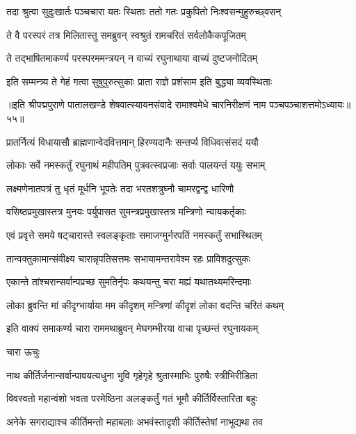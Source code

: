 \twolineshloka
{तदा श्रुत्वा सुदुःखार्तः पञ्चचारा यतः स्थिताः}
{ततो गतः प्रकुपितो निःश्वसन्मुहुरुच्छ्वसन्}%

\twolineshloka
{ते वै परस्परं तत्र मिलितास्तु समब्रुवन्}
{स्वश्रुतं रामचरितं सर्वलोकैकपूजितम्}%

\twolineshloka
{ते तद्भाषितमाकर्ण्य परस्परममन्त्रयन्}
{न वाच्यं रघुनाथाया वाच्यं दुष्टजनोदितम्}%

\twolineshloka
{इति सम्मन्त्र्य ते गेहं गत्वा सुषुपुरुत्सुकाः}
{प्राता राज्ञे प्रशंसाम इति बुद्ध्या व्यवस्थिताः}%

॥इति श्रीपद्मपुराणे पातालखण्डे शेषवात्स्यायनसंवादे रामाश्वमेधे चारनिरीक्षणं नाम पञ्चपञ्चाशत्तमोऽध्यायः॥५५॥



\twolineshloka
{प्रातर्नित्यं विधायासौ ब्राह्मणान्वेदवित्तमान्}
{हिरण्यदानैः सन्तर्प्य विधिवत्संसदं ययौ}%

\twolineshloka
{लोकाः सर्वे नमस्कर्तुं रघुनाथं महीपतिम्}
{पुत्रवत्स्वप्रजाः सर्वाः पालयन्तं ययुः सभाम्}%

\twolineshloka
{लक्ष्मणेनातपत्रं तु धृतं मूर्धनि भूपतेः}
{तदा भरतशत्रुघ्नौ चामरद्वन्द्व धारिणौ}%

\twolineshloka
{वसिष्ठप्रमुखास्तत्र मुनयः पर्युपासत}
{सुमन्त्रप्रमुखास्तत्र मन्त्रिणो न्यायकर्तृकाः}%

\twolineshloka
{एवं प्रवृत्ते समये षट्चारास्ते स्वलङ्कृताः}
{समाजग्मुर्नरपतिं नमस्कर्तुं सभास्थितम्}%

\twolineshloka
{तान्वक्तुकामान्संवीक्ष्य चारान्नृपतिसत्तमः}
{सभायामन्तरावेश्म रहः प्राविशदुत्सुकः}%

\twolineshloka
{एकान्ते तांश्चरान्सर्वान्पप्रच्छ सुमतिर्नृपः}
{कथयन्तु चरा मह्यं यथातथ्यमरिन्दमाः}%

\twolineshloka
{लोका ब्रुवन्ति मां कीदृग्भार्याया मम कीदृशम्}
{मन्त्रिणां कीदृशं लोका वदन्ति चरितं कथम्}%

\twolineshloka
{इति वाक्यं समाकर्ण्य चारा राममथाब्रुवन्}
{मेघगम्भीरया वाचा पृच्छन्तं रघुनायकम्}%

चारा ऊचुः

\twolineshloka
{नाथ कीर्तिर्जनान्सर्वान्पावयत्यधुना भुवि}
{गृहेगृहे श्रुतास्माभिः पुरुषैः स्त्रीभिरीडिता}%

\twolineshloka
{विवस्वतो महान्वंशो भवता परमेष्ठिना}
{अलङ्कर्तुं गतं भूमौ कीर्तिर्विस्तारिता बहुः}%

\twolineshloka
{अनेके सगराद्याश्च कीर्तिमन्तो महाबलाः}
{अभवंस्तादृशी कीर्तिस्तेषां नाभूद्यथा तव}%

